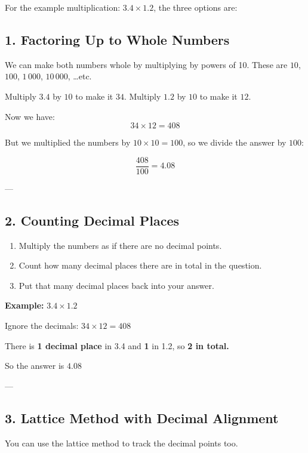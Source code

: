 \documentclass[12pt,a4paper]{article}
\begin{document}
For the example multiplication: $3.4 \times 1.2$, the three options are:

\subsection*{1. Factoring Up to Whole Numbers}


We can make both numbers whole by multiplying by powers of 10. These are $10$, $100$, $1\,000$, $10\,000$, \dots \quad etc.

Multiply \(3.4\) by \(10\) to make it \(34\).  
Multiply \(1.2\) by \(10\) to make it \(12\).

Now we have:
\[
34 \times 12 = 408
\]

But we multiplied the numbers by \(10 \times 10 = 100\),  
so we divide the answer by \(100\):

\[
\frac{408}{100} = 4.08
\]

---

\subsection*{2. Counting Decimal Places}

\begin{enumerate}
    \item Multiply the numbers as if there are no decimal points.  
    \item Count how many decimal places there are in total in the question.  
    \item Put that many decimal places back into your answer.
\end{enumerate}

\textbf{Example:} \(3.4 \times 1.2\)

Ignore the decimals: \(34 \times 12 = 408\)

There is \textbf{1 decimal place} in 3.4 and \textbf{1} in 1.2, so \textbf{2 in total.}

\vspace{1em}

So the answer is \(4.08\) 

---

\subsection*{3. Lattice Method with Decimal Alignment}

You can use the lattice method to track the decimal points too.
\end{document}
